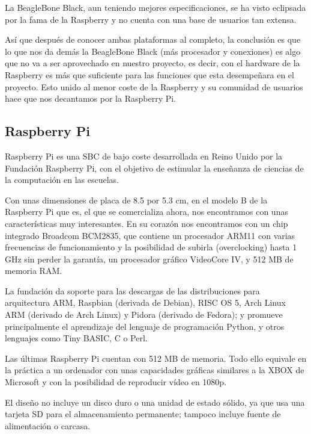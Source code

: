 La BeagleBone Black, aun teniendo mejores especificaciones, se ha visto eclipsada por la fama de la Raspberry y no cuenta con una base de usuarios tan extensa.



Así que después de conocer ambas plataformas al completo, la conclusión es que lo que nos da demás la BeagleBone Black (más procesador y conexiones) es algo que no va a ser aprovechado en nuestro proyecto, es decir, con el hardware de la Raspberry es más que suficiente para las funciones que esta desempeñara en el proyecto. Esto unido al menor coste de la Raspberry y su comunidad de usuarios hace que nos decantamos por la Raspberry Pi.



\subsection{Raspberry Pi}
Raspberry Pi es una SBC de bajo coste desarrollada en Reino Unido por la Fundación Raspberry Pi, con el objetivo de estimular la enseñanza de ciencias de la computación en las escuelas.



Con unas dimensiones de placa de 8.5 por 5.3 cm, en el modelo B de la Raspberry Pi que es, el que se comercializa ahora, nos encontramos con unas características muy interesantes. En su corazón nos encontramos con un chip integrado Broadcom BCM2835, que contiene un procesador ARM11 con varias frecuencias de funcionamiento y la posibilidad de subirla (overclocking) hasta 1 GHz sin perder la garantía, un procesador gráfico VideoCore IV, y 512 MB de memoria RAM.


La fundación da soporte para las descargas de las distribuciones para arquitectura ARM, Raspbian (derivada de Debian), RISC OS 5, Arch Linux ARM (derivado de Arch Linux) y Pidora (derivado de Fedora); y promueve principalmente el aprendizaje del lenguaje de programación Python, y otros lenguajes como Tiny BASIC, C o Perl.



Las últimas Raspberry Pi cuentan con 512 MB de memoria. Todo ello equivale en la práctica a un ordenador con unas capacidades gráficas similares a la XBOX de Microsoft y con la posibilidad de reproducir vídeo en 1080p.

El diseño no incluye un disco duro o una unidad de estado sólido, ya que usa una tarjeta SD para el almacenamiento permanente; tampoco incluye fuente de alimentación o carcasa.



